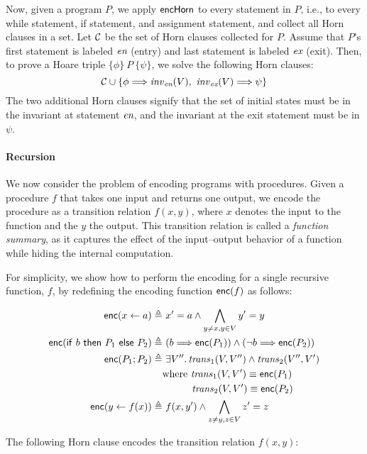 \documentclass{amsart}
\theoremstyle{definition}
\theoremstyle{remark}
\numberwithin{equation}{section}
\begin{document}
Now, given a program $P$, we apply $\mathsf{encHorn}$ to every statement
in $P$, i.e., to every while statement, if statement, and assignment
statement, and collect all Horn clauses in a set.
Let $\mathcal{C}$ be the set of Horn clauses collected for $P$.
Assume that $P$'s first statement is labeled $\emph{en}$ (entry) and last statement
is labeled $\emph{ex}$ (exit).
Then, to prove a Hoare triple $\{\phi\} \ P  \ \{\psi\}$,
we solve the following Horn clauses:
%
$$ \mathcal{C} \cup \{\phi \Longrightarrow \mathit{inv}_{\emph{en}}(V), \  \mathit{inv}_{\emph{ex}}(V) \Longrightarrow \psi\}$$
%
The two additional Horn clauses signify that the set of initial states
must be in the invariant at statement $\emph{en}$, and the
invariant at the exit statement must be in $\psi$.

\paragraph{Recursion} We now consider the problem of
encoding programs with procedures.
Given a procedure $f$ that takes one input and returns
one output, we encode the procedure as a transition
relation $f(x,y)$, where $x$ denotes the input to
the function and the $y$ the output. This transition relation
is called a \emph{function summary}, as it captures the effect
of the input--output behavior of a function while hiding the internal
computation.

For simplicity, we show how to perform the encoding for a single
recursive function, $f$, by redefining the encoding function
$\mathsf{enc}(f)$ as follows:

\begin{align*}
  \mathsf{enc}(x \gets a) \triangleq&~  x' = a \land \bigwedge_{y \neq x, y \in V} y' = y\\
  \mathsf{enc}(\mathsf{if}~ b ~ \mathsf{then}~ P_1 ~\mathsf{else}~ P_2) \triangleq&~
    (b \Longrightarrow \mathsf{enc}(P_1)) \land (\neg b \Longrightarrow \mathsf{enc}(P_2))\\
  \mathsf{enc}(P_1; P_2) \triangleq&~ \exists V'' \ldotp \mathit{trans}_1(V,V'') \land \mathit{trans}_2(V'',V')\\
  & \text{where } \mathit{trans}_1(V,V') \equiv \mathsf{enc}(P_1)\\
        & \hspace{3em} \mathit{trans}_2(V,V') \equiv \mathsf{enc}(P_2)\\
  \mathsf{enc}(y \gets f(x)) \triangleq&~ f(x,y') \land \bigwedge_{z \neq y, z \in V} z' = z\\
\end{align*}

The following Horn clause encodes the transition relation $f(x,y)$:
\end{document}
